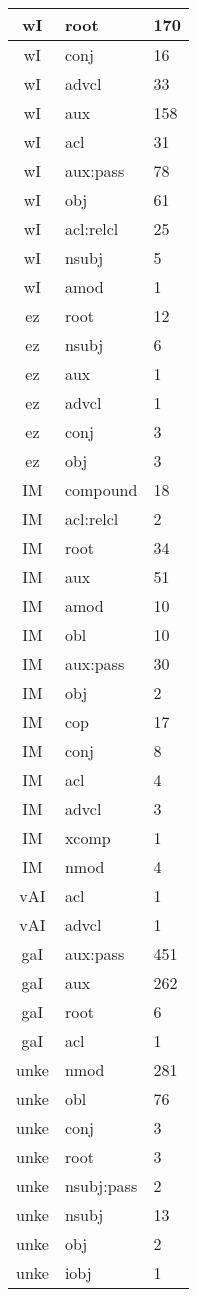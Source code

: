 \documentclass[a4 paper]{article}
\begin{document}
\begin{longtable}{cp{}p{}}
wI & root & 170\\ \midrule wI & conj & 16\\ \midrule wI & advcl & 33\\ \midrule wI & aux & 158\\ \midrule wI & acl & 31\\ \midrule wI & aux:pass & 78\\ \midrule wI & obj & 61\\ \midrule wI & acl:relcl & 25\\ \midrule wI & nsubj & 5\\ \midrule wI & amod & 1\\ \midrule 
ez & root & 12\\ \midrule ez & nsubj & 6\\ \midrule ez & aux & 1\\ \midrule ez & advcl & 1\\ \midrule ez & conj & 3\\ \midrule ez & obj & 3\\ \midrule 
IM & compound & 18\\ \midrule IM & acl:relcl & 2\\ \midrule IM & root & 34\\ \midrule IM & aux & 51\\ \midrule IM & amod & 10\\ \midrule IM & obl & 10\\ \midrule IM & aux:pass & 30\\ \midrule IM & obj & 2\\ \midrule IM & cop & 17\\ \midrule IM & conj & 8\\ \midrule IM & acl & 4\\ \midrule IM & advcl & 3\\ \midrule IM & xcomp & 1\\ \midrule IM & nmod & 4\\ \midrule 
vAI & acl & 1\\ \midrule vAI & advcl & 1\\ \midrule 
gaI & aux:pass & 451\\ \midrule gaI & aux & 262\\ \midrule gaI & root & 6\\ \midrule gaI & acl & 1\\ \midrule 
unke & nmod & 281\\ \midrule unke & obl & 76\\ \midrule unke & conj & 3\\ \midrule unke & root & 3\\ \midrule unke & nsubj:pass & 2\\ \midrule unke & nsubj & 13\\ \midrule unke & obj & 2\\ \midrule unke & iobj & 1\\ \midrule 

\end{longtable}
\end{document}

